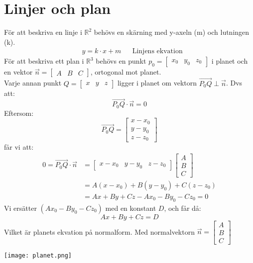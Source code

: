 \section{Linjer och plan} %
\label{sec:linjer_och_plan}
För att beskriva en linje i $\mathbb{R}^2$ behövs en skärning med y-axeln (m) och lutningen (k).
\begin{align}
    &y = k \cdot x + m &&\mbox{Linjens ekvation}
\end{align}
För att beskriva ett plan i $\mathbb{R}^3$ behövs en punkt $p_0 = \begin{bmatrix} x_0&y_0&z_0 \end{bmatrix}$ i planet och en vektor $\vec{n} = \begin{bmatrix} A &B &C \end{bmatrix}$, ortogonal mot planet.\\
Varje annan punkt $Q = \begin{bmatrix} x &y &z \end{bmatrix}$ ligger i planet om vektorn $\overrightarrow{P_0Q} \perp \vec{n}$. Dvs att:
\[
    \overrightarrow{P_0Q} \cdot \vec{n} = 0
\]
Eftersom:
\[
    \overrightarrow{P_0Q} = \begin{bmatrix} x-x_0\\y-y_0\\z-z_0 \end{bmatrix}
\]
får vi att:
\begin{align*}
0 = \overrightarrow{P_0Q} \cdot \vec{n} &= \begin{bmatrix} x-x_0 &y-y_0 &z-z_0 \end{bmatrix} \begin{bmatrix} A\\B\\C \end{bmatrix} \\&= A(x-x_0) + B(y-y_0) + C(z-z_0) \\&= Ax + By + Cz - Ax_0 - By_0 - Cz_0 = 0
\end{align*}
Vi ersätter $(Ax_0 - By_0 - Cz_0)$ med en konstant $D$, och får då:
\[
    Ax + By + Cz = D
\]
Vilket är planets ekvation på normalform. Med normalvektorn $\vec{n} = \begin{bmatrix} A\\B\\C \end{bmatrix}$
\begin{center}
    \texttt{[image: planet.png]}
\end{center}

